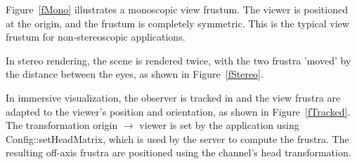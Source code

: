 \documentclass[10pt,a4]{scrartcl}
\newcommand{\fig}[1]{Figure~\ref{#1}}
\begin{document}
\fig{fMono} illustrates a monoscopic view frustum. The viewer is
positioned at the origin, and the frustum is completely symmetric. This
is the typical view frustum for non-stereoscopic applications.

In stereo rendering, the scene is rendered twice, with the two frustra
'moved' by the distance between the eyes, as shown in \fig{fStereo}.

In immersive visualization, the observer is tracked in and the view
frustra are adapted to the viewer's position and orientation, as shown
in \fig{fTracked}. The transformation origin $\rightarrow$ viewer is set by
the application using \textsf{Config::setHeadMatrix}, which is used by
the server to compute the frustra. The resulting off-axis frustra are
positioned using the channel's head transformation.

{\footnotesize\begin{lstlisting}
\end{lstlisting}}
\fi
\end{document}
